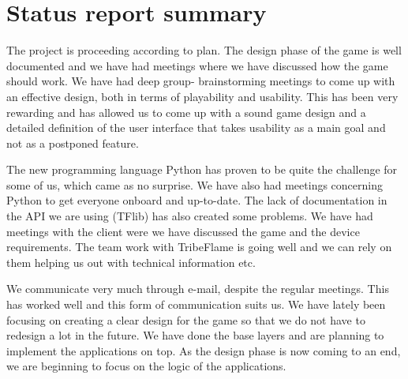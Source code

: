\documentclass[12pt,a4paper]{article}
\begin{document}
\section{Status report summary}

The project is proceeding according to plan. The design phase of the game is well documented and we have had meetings where we have discussed how the game should work. We have had deep group- brainstorming meetings to come up with an effective design, both in terms of playability and usability. This has been very rewarding and has allowed us to come up with a sound game design and a detailed definition of the user interface that takes usability as a main goal and not as a postponed feature.

The new programming language Python has proven to be quite the challenge for some of us, which came as no surprise. We have also had meetings concerning Python to get everyone onboard and up-to-date. The lack of documentation in the API we are using (TFlib) has also created some problems. We have had meetings with the client were we have discussed the game and the device requirements. The team work with TribeFlame is going well and we can rely on them helping us out with technical information etc.

We communicate very much through e-mail, despite the regular meetings. This has worked well and this form of communication suits us. We have lately been focusing on creating a clear design for the game so that we do not have to redesign a lot in the future. We have done the base layers and are planning to implement the applications on top. As the design phase is now coming to an end, we are beginning to focus on the logic of the applications.
\end{document}

